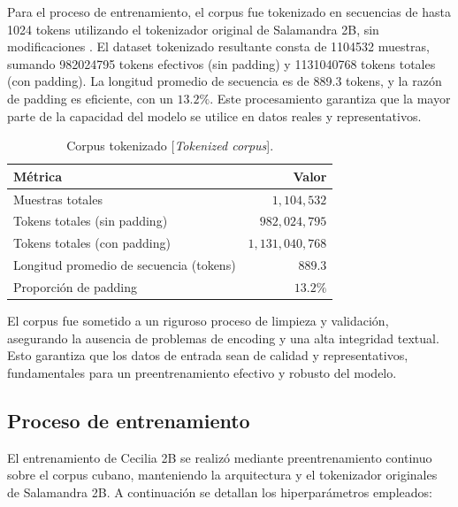 \documentclass[10pt,twoside]{rcmart} %
\begin{document}
Para el proceso de entrenamiento, el corpus fue tokenizado en secuencias de hasta 1024 tokens utilizando el tokenizador original de Salamandra 2B, sin modificaciones \cite{vo2024redwhale}. El dataset tokenizado resultante consta de 1104532 muestras, sumando 982024795 tokens efectivos (sin padding) y 1131040768 tokens totales (con padding). La longitud promedio de secuencia es de 889.3 tokens, y la razón de padding es eficiente, con un $13.2\%$. Este procesamiento garantiza que la mayor parte de la capacidad del modelo se utilice en datos reales y representativos.

\begin{table}[hbt]
\caption{Corpus tokenizado [\textit{Tokenized corpus}].}
\begin{center}
\begin{tabular}{lr}\hline\hline
Métrica 							   & Valor 			 \\\hline\hline
Muestras totales                       & $1,104,532$     \\
Tokens totales (sin padding)           & $982,024,795$   \\
Tokens totales (con padding)           & $1,131,040,768$ \\
Longitud promedio de secuencia (tokens)& $889.3$         \\
Proporción de padding                  & $13.2\%$        \\\hline\hline
\end{tabular}
\end{center}
\label{tab:tok-corpus}
\end{table}

El corpus fue sometido a un riguroso proceso de limpieza y validación, asegurando la ausencia de problemas de encoding y una alta integridad textual. Esto garantiza que los datos de entrada sean de calidad y representativos, fundamentales para un preentrenamiento efectivo y robusto del modelo.

\subsection{Proceso de entrenamiento}

El entrenamiento de Cecilia 2B se realizó mediante preentrenamiento continuo sobre el corpus cubano, manteniendo la arquitectura y el tokenizador originales de Salamandra 2B. A continuación se detallan los hiperparámetros empleados:
\end{document}
